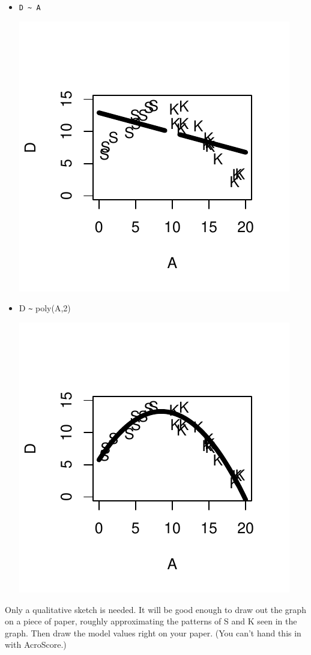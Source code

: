 \begin{itemize}
   
   
  \item \verb-D ~ A-
   
\begin{AnswerText}
\includegraphics{Figures/fig-fig-4-3-q5}
\end{AnswerText}


  
  
\item D \verb=~= poly(A,2)

\begin{AnswerText}
\includegraphics{Figures/fig-fig-4-3-q6}
\end{AnswerText}


  
  \end{itemize}
Only a qualitative sketch is needed.  It will be good enough to draw
out the graph on a piece of paper, roughly approximating the patterns
of S and K seen in the graph.  Then draw the model values right on
your paper.  (You can't hand this in with AcroScore.)
  
